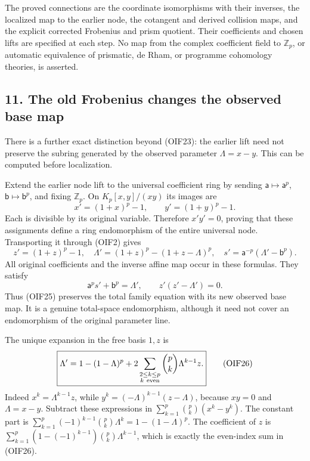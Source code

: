 \documentclass[
]{article}
\begin{document}
The proved connections are the coordinate isomorphisms with their
inverses, the localized map to the earlier node, the cotangent and
derived collision maps, and the explicit corrected Frobenius and prism
quotient. Their coefficients and chosen lifts are specified at each
step. No map from the complex coefficient field to \(\mathbb Z_p\), or
automatic equivalence of prismatic, de Rham, or programme cohomology
theories, is asserted.

\subsection{11. The old Frobenius changes the observed base
map}\label{the-old-frobenius-changes-the-observed-base-map}

There is a further exact distinction beyond (OIF23): the earlier lift
need not preserve the subring generated by the observed parameter
\(\Lambda=x-y\). This can be computed before localization.

Extend the earlier node lift to the universal coefficient ring by
sending \(\mathsf a\mapsto\mathsf a^p\),
\(\mathsf b\mapsto\mathsf b^p\), and fixing \(\mathbb Z_p\). On
\(K_p[x,y]/(xy)\) its images are \[
x'=(1+x)^p-1,\qquad y'=(1+y)^p-1.
\] Each is divisible by its original variable. Therefore \(x'y'=0\),
proving that these assignments define a ring endomorphism of the entire
universal node. Transporting it through (OIF2) gives \[
z'=(1+z)^p-1,\quad
\Lambda'=(1+z)^p-(1+z-\Lambda)^p,\quad
s'=\mathsf a^{-p}(\Lambda'-\mathsf b^p).
\tag{OIF25}
\] All original coefficients and the inverse affine map occur in these
formulas. They satisfy \[
\mathsf a^p s'+\mathsf b^p=\Lambda',
\qquad z'(z'-\Lambda')=0.
\] Thus (OIF25) preserves the total family equation with its new
observed base map. It is a genuine total-space endomorphism, although it
need not cover an endomorphism of the original parameter line.

The unique expansion in the free basis \(1,z\) is \[
\boxed{\Lambda'=1-(1-\Lambda)^p+
2\sum_{\substack{2\le k\le p\\k\ {\rm even}}}
\binom pk\Lambda^{k-1}z.}
\tag{OIF26}
\] Indeed \(x^k=\Lambda^{k-1}z\), while
\(y^k=(-\Lambda)^{k-1}(z-\Lambda)\), because \(xy=0\) and
\(\Lambda=x-y\). Subtract these expressions in
\(\sum_{k=1}^p\binom pk(x^k-y^k)\). The constant part is
\(\sum_{k=1}^p(-1)^{k-1}\binom pk\Lambda^k=1-(1-\Lambda)^p\). The
coefficient of \(z\) is
\(\sum_{k=1}^p(1-(-1)^{k-1})\binom pk\Lambda^{k-1}\), which is exactly
the even-index sum in (OIF26).
\end{document}
